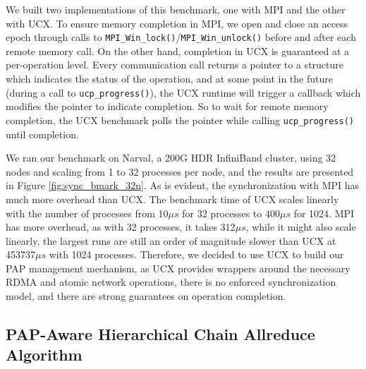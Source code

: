 

We built two implementations of this benchmark, one with \gls{MPI} and the other with \gls{UCX}. 
To ensure memory completion in \gls{MPI}, we open and close an access epoch through calls to \texttt{MPI\_Win\_lock()}/\texttt{MPI\_Win\_unlock()} before and after each remote memory call.
On the other hand, completion in \gls{UCX} is guaranteed at a per-operation level. 
Every communication call returns a pointer to a structure which indicates the status of the operation, and at some point in the future (during a call to \texttt{ucp\_progress()}), the \gls{UCX} runtime will trigger a callback which modifies the pointer to indicate completion.
So to wait for remote memory completion, the \gls{UCX} benchmark polls the pointer while calling \texttt{ucp\_progress()} until completion.

We ran our benchmark on Narval, a 200G HDR InfiniBand cluster, using 32 nodes and scaling from 1 to 32 processes per node, and the results are presented in Figure \ref{fig:sync_bmark_32n}.
As is evident, the synchronization with \gls{MPI} has much more overhead than \gls{UCX}.
The benchmark time of \gls{UCX} scales linearly with the number of processes from 10$\mu s$ for 32 processes to 400$\mu s$ for 1024.
\gls{MPI} has more overhead, as with 32 processes, it takes 312$\mu s$, while it might also scale linearly, the largest runs are still an order of magnitude slower than \gls{UCX} at 453737$\mu s$ with 1024 processes.
Therefore, we decided to use \gls{UCX} to build our \gls{PAP} management mechanism, as \gls{UCX} provides wrappers around the necessary \gls{RDMA} and atomic network operations, there is no enforced synchronization model, and there are strong guarantees on operation completion. 



\subsection{PAP-Aware Hierarchical Chain Allreduce Algorithm}

